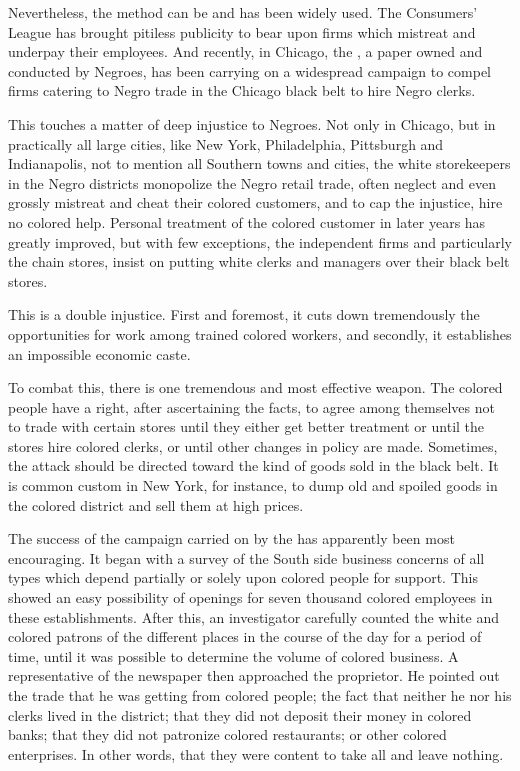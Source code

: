 \documentclass[letterpaper,10pt,english]{jupyterBook}
\begin{document}
\sphinxAtStartPar
Nevertheless, the method can be and has been widely used. The Consumers’ League has brought pitiless publicity to bear upon firms which mistreat and underpay their employees. And recently, in Chicago, the , a paper owned and conducted by Negroes, has been carrying on a widespread campaign to compel firms catering to Negro trade in the Chicago black belt to hire Negro clerks.

\sphinxAtStartPar
This touches a matter of deep injustice to Negroes. Not only in Chicago, but in practically all large cities, like New York, Philadelphia, Pittsburgh and Indianapolis, not to mention all Southern towns and cities, the white storekeepers in the Negro districts monopolize the Negro retail trade, often neglect and even grossly mistreat and cheat their colored customers, and to cap the injustice, hire no colored help. Personal treatment of the colored customer in later years has greatly improved, but with few exceptions, the independent firms and particularly the chain stores, insist on putting white clerks and managers over their black belt stores.

\sphinxAtStartPar
This is a double injustice. First and foremost, it cuts down tremendously the opportunities for work among trained colored workers, and secondly, it establishes an impossible economic caste.

\sphinxAtStartPar
To combat this, there is one tremendous and most effective weapon. The colored people have a right, after ascertaining the facts, to agree among themselves not to trade with certain stores until they either get better treatment or until the stores hire colored clerks, or until other changes in policy are made. Sometimes, the attack should be directed toward the kind of goods sold in the black belt. It is common custom in New York, for instance, to dump old and spoiled goods in the colored district and sell them at high prices.

\sphinxAtStartPar
The success of the campaign carried on by the  has apparently been most encouraging. It began with a survey of the South side business concerns of all types which depend partially or solely upon colored people for support. This showed an easy possibility of openings for seven thousand colored employees in these establishments. After this, an investigator carefully counted the white and colored patrons of the different places in the course of the day for a period of time, until it was possible to determine the volume of colored business. A representative of the newspaper then approached the proprietor. He pointed out the trade that he was getting from colored people; the fact that neither he nor his clerks lived in the district; that they did not deposit their money in colored banks; that they did not patronize colored restaurants; or other colored enterprises. In other words, that they were content to take all and leave nothing.
\end{document}
